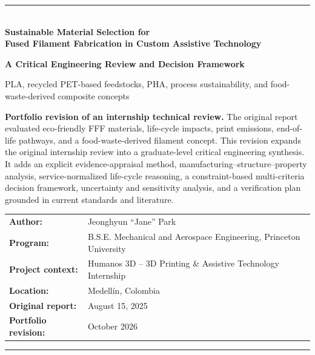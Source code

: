 \documentclass[11pt]{article}
\begin{document}
\begin{titlepage}
\thispagestyle{empty}
\vspace*{0.9in}

{\color{navy}\rule{\textwidth}{1.2pt}}\\[0.45in]

{\Huge\bfseries\color{navy}
Sustainable Material Selection for\\[0.12in]
Fused Filament Fabrication in Custom Assistive Technology\\[0.12in]
}\vspace{0.18in}

{\LARGE\bfseries
A Critical Engineering Review and Decision Framework\\[0.12in]
}

\vspace{0.25in}
{\large\color{slate}
PLA, recycled PET-based feedstocks, PHA, process sustainability, and food-waste-derived composite concepts
}

\vspace{0.6in}

\begin{tcolorbox}[colback=lightblue,colframe=navy,boxrule=0.7pt,arc=2pt,width=0.92\textwidth]
\textbf{Portfolio revision of an internship technical review.} The original report evaluated eco-friendly FFF materials, life-cycle impacts, print emissions, end-of-life pathways, and a food-waste-derived filament concept. This revision expands the original internship review into a graduate-level critical engineering synthesis. It adds an explicit evidence-appraisal method, manufacturing--structure--property analysis, service-normalized life-cycle reasoning, a constraint-based multi-criteria decision framework, uncertainty and sensitivity analysis, and a verification plan grounded in current standards and literature.
\end{tcolorbox}

\vfill

\begin{tabular}{@{}ll@{}}
\textbf{Author:} & Jeonghyun ``Jane'' Park \\
\textbf{Program:} & B.S.E. Mechanical and Aerospace Engineering, Princeton University \\
\textbf{Project context:} & Humanos 3D -- 3D Printing \& Assistive Technology Internship \\
\textbf{Location:} & Medell\'{i}n, Colombia \\
\textbf{Original report:} & August 15, 2025 \\
\textbf{Portfolio revision:} & October 2026 \\
\end{tabular}

\vspace{0.4in}
{\color{navy}\rule{\textwidth}{1.2pt}}
\end{titlepage}
\end{document}
